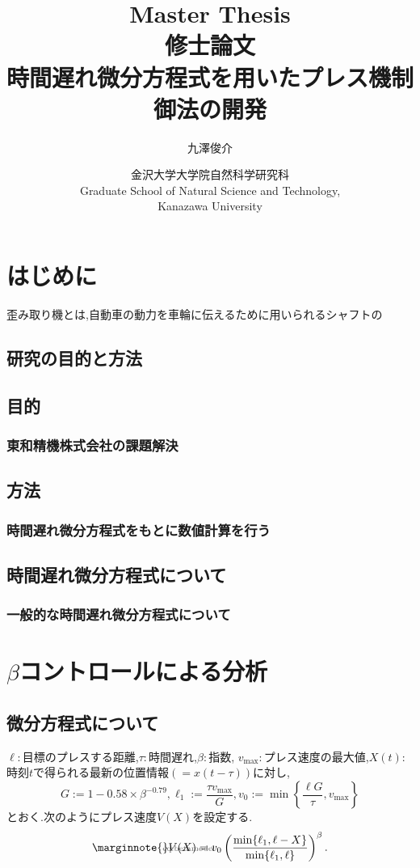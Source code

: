 \documentclass[leqno,11pt]{jarticle}
\title{Master Thesis \\ \bigskip 
修士論文 \\ \bigskip 
{\bf  時間遅れ微分方程式を用いたプレス機制御法の開発 }\\ \bigskip 
}
\author{九澤俊介}
\date{金沢大学大学院自然科学研究科 \\
Graduate School of Natural Science and Technology, \\
Kanazawa University}
\makeatletter
\let\temp@label\label
\def\label#1{\marginnote{\hbox to 0pt{\scriptsize \textcolor{black!60}{#1}\hss}}\temp@label{#1}\ignorespaces}
\numberwithin{equation}{section}
\theoremstyle{definition} %
\theoremstyle{definition} %
\makeatother
\begin{document}
\maketitle
\thispagestyle{empty}
\setcounter{page}{-1}


\thispagestyle{empty}

\mbox{}\newpage 

\tableofcontents

\newpage 
\section{はじめに}
歪み取り機とは,自動車の動力を車輪に伝えるために用いられるシャフトの
\subsection{研究の目的と方法} 
\subsection{目的}
\subsubsection{東和精機株式会社の課題解決}
\subsection{方法}
\subsubsection{時間遅れ微分方程式をもとに数値計算を行う}
\subsection{時間遅れ微分方程式について}
\subsubsection{一般的な時間遅れ微分方程式について}

\section{$\beta$コントロールによる分析}
\subsection{微分方程式について}
$\ell:$目標のプレスする距離,$\tau:$時間遅れ,$\beta:$指数,
$v_{\max}:$プレス速度の最大値,$X(t):$
時刻$t$で得られる最新の位置情報$(=x(t-\tau))$に対し,
\begin{equation}
    G:=1-0.58\times\beta^{-0.79},\ell_1:=\frac{\tau v_{\max}}{G},v_0:=\min\left\{\displaystyle\frac{\ell G}{\tau},v_{\max}\right\}
\end{equation}
とおく.次のようにプレス速度$V(X)$を設定する.
\begin{equation}\label{eq:betamodel}
    V(X)=v_0\left(\displaystyle\frac{\min\{\ell_1,\ell-X\}}{\min\{\ell_1,\ell\}}\right)^\beta.
\end{equation}
\end{document}
